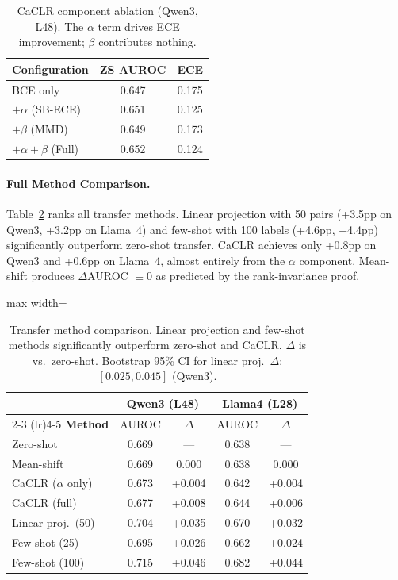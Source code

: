 \documentclass[11pt,a4paper]{article}
\begin{document}
\begin{table}[t]
\centering
\small
\begin{tabular}{lcc}
\toprule
\textbf{Configuration} & \textbf{ZS AUROC} & \textbf{ECE} \\
\midrule
BCE only & 0.647 & 0.175 \\
$+\alpha$ (SB-ECE) & 0.651 & 0.125 \\
$+\beta$ (MMD) & 0.649 & 0.173 \\
$+\alpha + \beta$ (Full) & 0.652 & 0.124 \\
\bottomrule
\end{tabular}
\caption{CaCLR component ablation (Qwen3, L48). The $\alpha$ term drives ECE improvement; $\beta$ contributes nothing.}
\label{tab:ablation}
\end{table}

\paragraph{Full Method Comparison.}
Table~\ref{tab:method_comparison} ranks all transfer methods.
Linear projection with 50 pairs (+3.5pp on Qwen3, +3.2pp on Llama~4) and few-shot with 100 labels (+4.6pp, +4.4pp) significantly outperform zero-shot transfer.
CaCLR achieves only +0.8pp on Qwen3 and +0.6pp on Llama~4, almost entirely from the $\alpha$ component.
Mean-shift produces $\Delta$AUROC $\equiv 0$ as predicted by the rank-invariance proof.

\begin{table}[t]
\centering
\small
\begin{adjustbox}{max width=\columnwidth}
\begin{tabular}{lcccc}
\toprule
& \multicolumn{2}{c}{\textbf{Qwen3 (L48)}} & \multicolumn{2}{c}{\textbf{Llama4 (L28)}} \\
\cmidrule(lr){2-3} \cmidrule(lr){4-5}
\textbf{Method} & AUROC & $\Delta$ & AUROC & $\Delta$ \\
\midrule
Zero-shot & 0.669 & --- & 0.638 & --- \\
Mean-shift & 0.669 & 0.000 & 0.638 & 0.000 \\
CaCLR ($\alpha$ only) & 0.673 & +0.004 & 0.642 & +0.004 \\
CaCLR (full) & 0.677 & +0.008 & 0.644 & +0.006 \\
\midrule
Linear proj.\ (50) & 0.704 & +0.035 & 0.670 & +0.032 \\
Few-shot (25) & 0.695 & +0.026 & 0.662 & +0.024 \\
Few-shot (100) & 0.715 & +0.046 & 0.682 & +0.044 \\
\bottomrule
\end{tabular}
\end{adjustbox}
\caption{Transfer method comparison. Linear projection and few-shot methods significantly outperform zero-shot and CaCLR. $\Delta$ is vs.\ zero-shot. Bootstrap 95\% CI for linear proj.\ $\Delta$: $[0.025, 0.045]$ (Qwen3).}
\label{tab:method_comparison}
\end{table}
\end{document}
